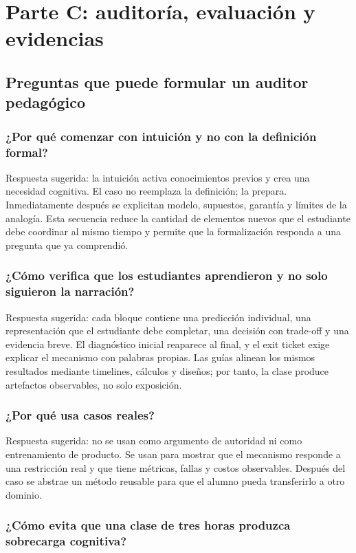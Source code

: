 \documentclass[variant=docente,cover=institutional,mode=screen]{ua-engineering-v6-article}
\begin{document}
\clearpage
\section{Parte C: auditoría, evaluación y evidencias}
\subsection{Preguntas que puede formular un auditor pedagógico}
\subsubsection{¿Por qué comenzar con intuición y no con la definición formal?}

Respuesta sugerida: la intuición activa conocimientos previos y crea una necesidad cognitiva. El caso no reemplaza la definición; la prepara. Inmediatamente después se explicitan modelo, supuestos, garantía y límites de la analogía. Esta secuencia reduce la cantidad de elementos nuevos que el estudiante debe coordinar al mismo tiempo y permite que la formalización responda a una pregunta que ya comprendió.

\subsubsection{¿Cómo verifica que los estudiantes aprendieron y no solo siguieron la narración?}

Respuesta sugerida: cada bloque contiene una predicción individual, una representación que el estudiante debe completar, una decisión con trade-off y una evidencia breve. El diagnóstico inicial reaparece al final, y el exit ticket exige explicar el mecanismo con palabras propias. Las guías alinean los mismos resultados mediante timelines, cálculos y diseños; por tanto, la clase produce artefactos observables, no solo exposición.

\subsubsection{¿Por qué usa casos reales?}

Respuesta sugerida: no se usan como argumento de autoridad ni como entrenamiento de producto. Se usan para mostrar que el mecanismo responde a una restricción real y que tiene métricas, fallas y costos observables. Después del caso se abstrae un método reusable para que el alumno pueda transferirlo a otro dominio.

\subsubsection{¿Cómo evita que una clase de tres horas produzca sobrecarga cognitiva?}
\end{document}
